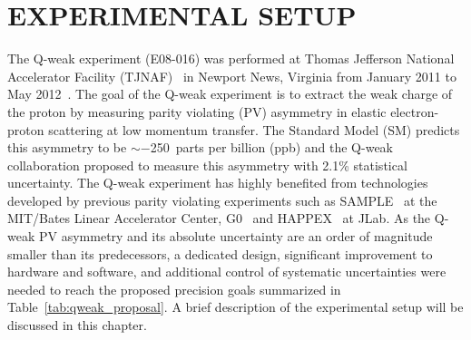 \chapter{EXPERIMENTAL SETUP}
\label{EXPERIMENTAL SETUP}

The Q-weak experiment (E08-016) was performed at Thomas Jefferson National Accelerator Facility (TJNAF)~\cite{website:jlab} in Newport News, Virginia from January 2011 to May 2012~\cite{qweak_proposal_2001, qweak_proposal_2004, qweak_proposal_2007}. 
The goal of the Q-weak experiment is to extract the weak charge of the proton by measuring parity violating (PV) asymmetry in elastic electron-proton scattering at low momentum transfer. The Standard Model (SM) predicts this asymmetry to be $\sim-$250~parts per billion (ppb) and the Q-weak collaboration proposed to measure this asymmetry with 2.1\% statistical uncertainty. The Q-weak experiment has highly benefited from technologies developed by previous parity violating experiments such as SAMPLE~\cite{Beise2005289} at the MIT/Bates Linear Accelerator Center, G0~\cite{PhysRevLett.95.092001} and HAPPEX~\cite{PhysRevLett.96.022003} at JLab. As the Q-weak PV asymmetry and its absolute uncertainty are an order of magnitude smaller than its predecessors, a dedicated design, significant improvement to hardware and software, and additional control of systematic uncertainties were needed to reach the proposed precision goals summarized in Table~\ref{tab:qweak_proposal}. A brief description of the experimental setup will be discussed in this chapter.

